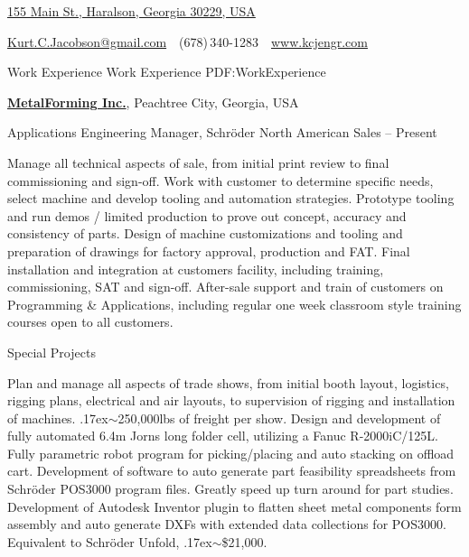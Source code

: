 \documentclass[
letterpaper,
MMMyyyy,
nonstopmode,
draftmode,
]{resume}
\makeatletter
\newcommand{\CVAuthor}{Kurt C. Jacobson}
\newcommand{\CVWebpage}{www.kcjengr.com}
\newcommand{\CVEmail}{Kurt.C.Jacobson@gmail.com}
\makeatother
\begin{document}

\Title{\CVAuthor}

\begin{SubTitle}
\href{https://www.google.com/maps/place/155+Main+St,+Haralson,+GA+30229/}
{155 Main St., Haralson, Georgia 30229, USA}
\par
\href{mailto:\CVEmail}
{\CVEmail}
\,\SubBulletSymbol\,
(678)\,340-1283
\,\SubBulletSymbol\,
\href{\CVWebpage}
{\url{\CVWebpage}}
\end{SubTitle}

\begin{Body}



\Section
{Work Experience}
{Work Experience}
{PDF:WorkExperience}


\Entry
\href{http://www.metalforming-usa.net/}
{\textbf{MetalForming Inc.}},
Peachtree City, Georgia, USA

\Gap
\BulletItem
Applications Engineering Manager,
Schr{\"o}der North American Sales
\hfill
{} --
Present
\begin{Detail}
\SubBulletItem
Manage all technical aspects of sale, from initial print review to final commissioning and sign-off.
\SubBulletItem
Work with customer to determine specific needs, select machine and develop tooling and automation strategies.
\SubBulletItem
Prototype tooling and run demos / limited production to prove out concept, accuracy and consistency of parts.
\SubBulletItem
Design of machine customizations and tooling and preparation of drawings for factory approval, production and FAT.
\SubBulletItem
Final installation and integration at customers facility, including training, commissioning, SAT and sign-off.
\SubBulletItem
After-sale support and train of customers on Programming {\&} Applications, including regular one week classroom style training courses open to all customers.
\end{Detail}

\Gap
\BulletItem
Special Projects
\hfill
\begin{Detail}
\SubBulletItem
Plan and manage all aspects of trade shows, from initial booth layout, logistics, rigging plans, electrical and air layouts, to supervision of rigging and installation of machines. {\raise.17ex\hbox{$\scriptstyle\mathtt{\sim}$}}250,000lbs of freight per show.
\SubBulletItem
Design and development of fully automated 6.4m Jorns long folder cell, utilizing a Fanuc R-2000iC/125L. Fully parametric robot program for picking/placing and auto stacking on offload cart.
\SubBulletItem
Development of software to auto generate part feasibility spreadsheets from Schr{\"o}der POS3000 program files. Greatly speed up turn around for part studies.
\SubBulletItem
Development of Autodesk Inventor plugin to flatten sheet metal components form assembly and auto generate DXFs with extended data collections for POS3000. Equivalent to  Schr{\"o}der Unfold, {\raise.17ex\hbox{$\scriptstyle\mathtt{\sim}$}}{\$}21,000.
\end{Detail}


\end{Body}
\end{document}
